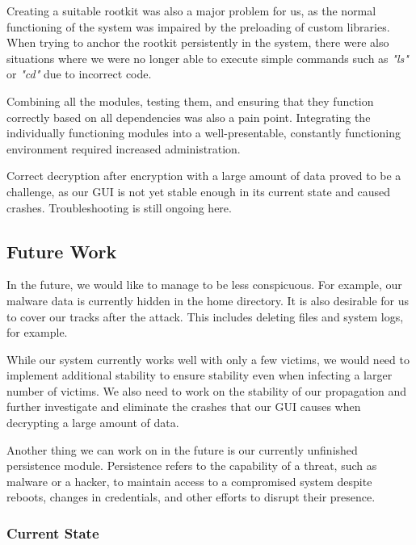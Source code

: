 Creating a suitable rootkit was also a major problem for us, as the normal functioning of the system was impaired by the preloading of custom libraries. When trying to anchor the rootkit persistently in the system, there were also situations where we were no longer able to execute simple commands such as \textit{"ls"} or \textit{"cd"} due to incorrect code.

Combining all the modules, testing them, and ensuring that they function correctly based on all dependencies was also a pain point. Integrating the individually functioning modules into a well-presentable, constantly functioning environment required increased administration.

Correct decryption after encryption with a large amount of data proved to be a challenge, as our GUI is not yet stable enough in its current state and caused crashes. Troubleshooting is still ongoing here.


\subsection{Future Work}
\label{sec:future_work}

In the future, we would like to manage to be less conspicuous. For example, our malware data is currently hidden in the home directory. It is also desirable for us to cover our tracks after the attack. This includes deleting files and system logs, for example.

While our system currently works well with only a few victims, we would need to implement additional stability to ensure stability even when infecting a larger number of victims. We also need to work on the stability of our propagation and further investigate and eliminate the crashes that our GUI causes when decrypting a large amount of data.

Another thing we can work on in the future is our currently unfinished persistence module. Persistence refers to the capability of a threat, such as malware or a hacker, to maintain access to a compromised system despite reboots, changes in credentials, and other efforts to disrupt their presence.


\subsubsection{Current State}
\label{sec:current_state}

